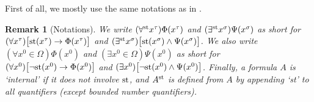 \documentclass[reqno]{amsart}
\newtheorem{rem}[thm]{Remark}
\def\st{\textup{st}}
\def\di{\rightarrow}
\numberwithin{equation}{section}
\numberwithin{thm}{section}
\begin{document}
First of all, we mostly use the same notations as in \cite{brie}.  %
\begin{rem}[Notations]\label{notawin}\rm
We write $(\forall^{\st}x^{\tau})\Phi(x^{\tau})$ and $(\exists^{\st}x^{\sigma})\Psi(x^{\sigma})$ as short for 
$(\forall x^{\tau})\big[\st(x^{\tau})\di \Phi(x^{\tau})\big]$ and $(\exists^{\st}x^{\sigma})\big[\st(x^{\sigma})\wedge \Psi(x^{\sigma})\big]$.     
We also write $(\forall x^{0}\in \Omega)\Phi(x^{0})$ and $(\exists x^{0}\in \Omega)\Psi(x^{0})$ as short for 
$(\forall x^{0})\big[\neg\st(x^{0})\di \Phi(x^{0})\big]$ and $(\exists x^{0})\big[\neg\st(x^{0})\wedge \Psi(x^{0})\big]$.  
Finally, a formula $A$ is `internal' if it does not involve $\st$, and $A^{\st}$ is defined from $A$ by appending `st' to all quantifiers (except bounded number quantifiers).    
\end{rem}
\medskip
\end{document}
